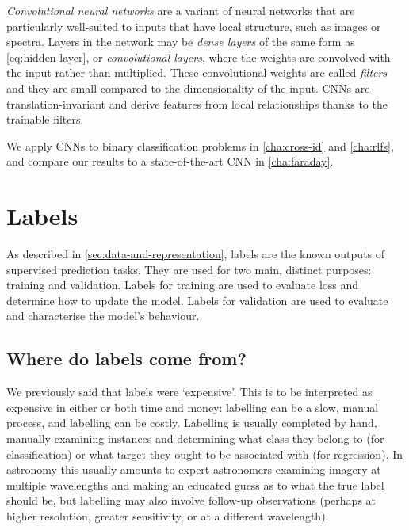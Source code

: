 \documentclass[11pt, a4paper]{book}
\newcommand{\defn}[1]{\emph{#1}}
\begin{document}
        \defn{Convolutional neural networks} \citep[CNN;][]{lecun98} are a variant of neural networks that are particularly well-suited to inputs that have local structure, such as images or spectra. Layers in the network may be \defn{dense layers} of the same form as \autoref{eq:hidden-layer}, or \defn{convolutional layers}, where the weights are convolved with the input rather than multiplied. These convolutional weights are called \defn{filters} and they are small compared to the dimensionality of the input. CNNs are translation-invariant \citep{waibel_phoneme_1989} and derive features from local relationships thanks to the trainable filters.

        We apply CNNs to binary classification problems in \autoref{cha:cross-id} and \autoref{cha:rlfs}, and compare our results to a state-of-the-art CNN in \autoref{cha:faraday}.

\section{Labels}
\label{sec:labels}

    As described in \autoref{sec:data-and-representation}, labels are the known outputs of supervised prediction tasks. They are used for two main, distinct purposes: training and validation. Labels for training are used to evaluate loss and determine how to update the model. Labels for validation are used to evaluate and characterise the model's behaviour.

    \subsection{Where do labels come from?}
    \label{sec:sources-of-labels}

        We previously said that labels were `expensive'. This is to be interpreted as expensive in either or both time and money: labelling can be a slow, manual process, and labelling can be costly. Labelling is usually completed by hand, manually examining instances and determining what class they belong to (for classification) or what target they ought to be associated with (for regression). In astronomy this usually amounts to expert astronomers examining imagery at multiple wavelengths and making an educated guess as to what the true label should be, but labelling may also involve follow-up observations (perhaps at higher resolution, greater sensitivity, or at a different wavelength).
\end{document}
